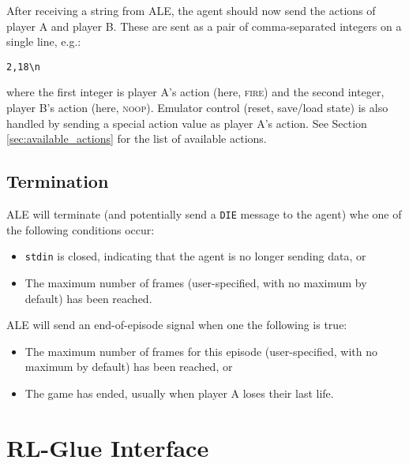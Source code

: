 \documentclass[12pt]{article}
\begin{document}
After receiving a string from ALE, the agent should now send the actions of player A and player B.
These are sent as a pair of comma-separated integers on a single line, e.g.:

\begin{verbatim}
2,18\n
\end{verbatim}

where the first integer is player A's action (here, \textsc{fire}) and the second integer, player B's action (here, \textsc{noop}). Emulator control (reset, save/load state) is also handled by sending a special action value as player A's action. See Section \ref{sec:available_actions} for the list of available actions.

\subsection{Termination}\label{subsec:termination_conditions}

ALE will terminate (and potentially send a \verb+DIE+ message to the agent) whe one of the following conditions occur:

\begin{itemize}
  \item{\texttt{stdin} is closed, indicating that the agent is no longer sending data, or}
  \item{The maximum number of frames (user-specified, with no maximum by default) has been reached.}
\end{itemize}

ALE will send an end-of-episode signal when one the following is true:

\begin{itemize}
  \item{The maximum number of frames for this episode (user-specified, with no maximum by default) has been reached, or}
  \item{The game has ended, usually when player A loses their last life.}
\end{itemize}

\section{RL-Glue Interface}\label{sec:rlglue_interface}

\end{document}

